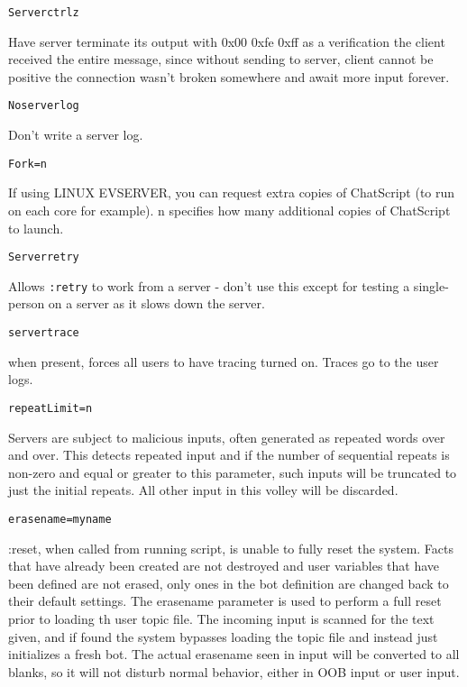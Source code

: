 \documentclass[]{article}
\begin{document}
\begin{verbatim}
Serverctrlz
\end{verbatim}

Have server terminate its output with 0x00 0xfe 0xff as a verification
the client received the entire message, since without sending to server,
client cannot be positive the connection wasn't broken somewhere and
await more input forever.

\begin{verbatim}
Noserverlog
\end{verbatim}

Don't write a server log.

\begin{verbatim}
Fork=n
\end{verbatim}

If using LINUX EVSERVER, you can request extra copies of ChatScript (to
run on each core for example). n specifies how many additional copies of
ChatScript to launch.

\begin{verbatim}
Serverretry
\end{verbatim}

Allows \texttt{:retry} to work from a server - don't use this except for
testing a single-person on a server as it slows down the server.

\begin{verbatim}
servertrace
\end{verbatim}

when present, forces all users to have tracing turned on. Traces go to
the user logs.

\begin{verbatim}
repeatLimit=n
\end{verbatim}

Servers are subject to malicious inputs, often generated as repeated
words over and over. This detects repeated input and if the number of
sequential repeats is non-zero and equal or greater to this parameter,
such inputs will be truncated to just the initial repeats. All other
input in this volley will be discarded.

\begin{verbatim}
erasename=myname
\end{verbatim}

:reset, when called from running script, is unable to fully reset the
system. Facts that have already been created are not destroyed and user
variables that have been defined are not erased, only ones in the bot
definition are changed back to their default settings. The erasename
parameter is used to perform a full reset prior to loading th user topic
file. The incoming input is scanned for the text given, and if found the
system bypasses loading the topic file and instead just initializes a
fresh bot. The actual erasename seen in input will be converted to all
blanks, so it will not disturb normal behavior, either in OOB input or
user input.
\end{document}
